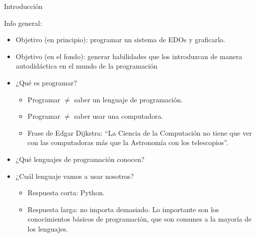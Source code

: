 \documentclass{beamer}
\begin{document}
\begin{frame}{Introducción}
  \begin{block}{Info general:}

  \end{block}\pause
  \begin{itemize}
  	\item Objetivo (en principio): programar un sistema de EDOs y graficarlo.
	\pause
	\item Objetivo (en el fondo): generar habilidades que los introduzcan de manera autodidáctica en el mundo de la programación \pause
	\item ¿Qué es programar? \pause
		\begin{itemize}
			\item Programar $\neq$ saber un lenguaje de programación. \pause
			\item Programar $\neq$ saber usar una computadora. \pause
			\item Frase de Edgar Dijkstra: ``La Ciencia de la Computación no tiene que ver con las computadoras más que la Astronomía con los telescopios''.\pause
		\end{itemize}
	\item ¿Qué lenguajes de programación conocen?\pause
	\item ¿Cuál lenguaje vamos a usar nosotros?\pause
	\begin{itemize}
		\item Respuesta corta: Python. \pause
		\item Respuesta larga: no importa demasiado. Lo importante  son los conocimientos básicos de programación, que son comunes a la mayoría de los lenguajes.%
	\end{itemize}
  \end{itemize}
\end{frame}
\end{document}
